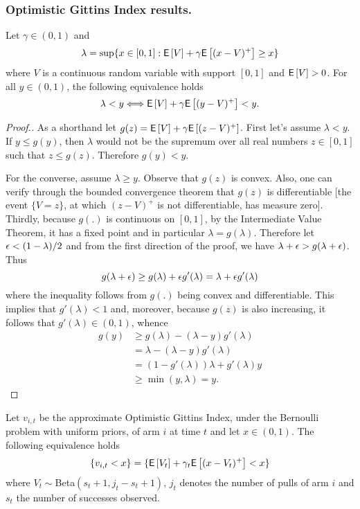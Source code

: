 \subsubsection{Optimistic Gittins Index results.} \label{sec:amgi_results}
\begin{lemma} \label{eq:important_fact}
	Let $\gamma \in (0,1)$ and
	\begin{equation} \label{eq:def_lambda_in_important_equiv}
	\lambda = \sup\{ x \in [0,1] : \mathsf{E} \left[ V \right] + \gamma \mathsf{E} \left[ (x - V)^+ \right] \ge x\}
	\end{equation} 
	where $V$ is a continuous random variable with support $[0,1]$ and $\mathsf{E} \left[ V \right] > 0$. For all $y \in (0,1)$, the following equivalence holds
	\begin{equation} \label{eq:equivlance_lambda1}
	\lambda < y  \Longleftrightarrow \mathsf{E} \left[ V \right] + \gamma 
	\mathsf{E} \left[ (y - V)^+ \right] < y.
	\end{equation}
\end{lemma}
\begin{proof}[Proof.]
	As a shorthand let $g(z) = \mathsf{E} \left[ V \right] + \gamma \mathsf{E} \left[ (z - V)^+ \right]$. First let's assume $\lambda < y$. If $y \le g(y)$, then $\lambda$ would not be the supremum over all real numbers $z \in [0,1]$ such that $ z \le g(z)$. Therefore $g(y) < y$.
	
	For the converse, assume $\lambda \ge y$. Observe that $g(z)$ is convex. Also, one can verify through the bounded convergence theorem that $g(z)$ is differentiable [the event $\{V=z\}$, at which $(z-V)^+$ is not differentiable, has measure zero]. Thirdly, because $g(.)$ is continuous on $[0,1]$, by the Intermediate Value Theorem, it has a fixed point and in particular $\lambda =g(\lambda)$. Therefore let $\epsilon < (1-\lambda)/2$ and from the first direction of the proof, we have $\lambda + \epsilon > g(\lambda + \epsilon)$. Thus
	\[
	g(\lambda + \epsilon) \ge g(\lambda) + \epsilon g'(\lambda) = \lambda + \epsilon g'(\lambda)
	\]
	where the inequality follows from $g(.)$ being convex and differentiable. This implies that $g'(\lambda) < 1$ and, moreover, because $g(z)$ is also increasing, it follows that $g'(\lambda) \in (0,1)$, whence
	\begin{align*}
	g(y) & \ge g(\lambda) - (\lambda - y) g'(\lambda) \\
	& = \lambda - (\lambda - y) g'(\lambda) \\
	& = (1-g'(\lambda)) \lambda + g'(\lambda) y \\
	& \ge \min(y,\lambda) = y.
	\end{align*}
\end{proof}
\begin{corollary} \label{cor:equivalent_event}
	Let $v_{i,t}$ be the approximate Optimistic Gittins Index, under the Bernoulli problem with uniform priors, of arm $i$ at time $t$ and let $x \in (0,1)$. The following equivalence holds
	\[
	\{v_{i,t} < x \} = \{\mathsf{E} \left[ V_t \right] + \gamma_t \mathsf{E} \left[ (x-V_t)^+ \right] < x\}\]
	where $V_t \sim $Beta$(s_t+1,j_t - s_t + 1)$, $j_t$ denotes the number of pulls of arm $i$ and $s_t$ the number of successes observed.
\end{corollary}

